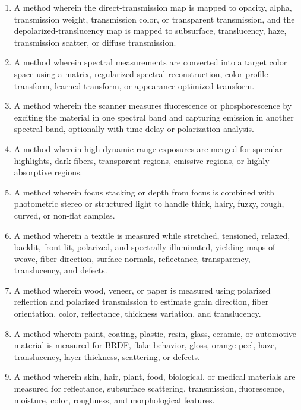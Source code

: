 \documentclass[11pt, twoside, listof=totocnumbered, bibliography=totocnumbered]{scrartcl}
\begin{document}
\begin{enumerate}
		\item A method wherein the direct-transmission map is mapped to opacity, alpha, transmission weight, transmission color, or transparent transmission, and the depolarized-translucency map is mapped to subsurface, translucency, haze, transmission scatter, or diffuse transmission.
		
		\item A method wherein spectral measurements are converted into a target color space using a matrix, regularized spectral reconstruction, color-profile transform, learned transform, or appearance-optimized transform.
		
		\item A method wherein the scanner measures fluorescence or phosphorescence by exciting the material in one spectral band and capturing emission in another spectral band, optionally with time delay or polarization analysis.
		
		\item A method wherein high dynamic range exposures are merged for specular highlights, dark fibers, transparent regions, emissive regions, or highly absorptive regions.
		
		\item A method wherein focus stacking or depth from focus is combined with photometric stereo or structured light to handle thick, hairy, fuzzy, rough, curved, or non-flat samples.
		
		\item A method wherein a textile is measured while stretched, tensioned, relaxed, backlit, front-lit, polarized, and spectrally illuminated, yielding maps of weave, fiber direction, surface normals, reflectance, transparency, translucency, and defects.
		
		\item A method wherein wood, veneer, or paper is measured using polarized reflection and polarized transmission to estimate grain direction, fiber orientation, color, reflectance, thickness variation, and translucency.
		
		\item A method wherein paint, coating, plastic, resin, glass, ceramic, or automotive material is measured for BRDF, flake behavior, gloss, orange peel, haze, translucency, layer thickness, scattering, or defects.
		
		\item A method wherein skin, hair, plant, food, biological, or medical materials are measured for reflectance, subsurface scattering, transmission, fluorescence, moisture, color, roughness, and morphological features.
		

\end{enumerate}
\end{document}

